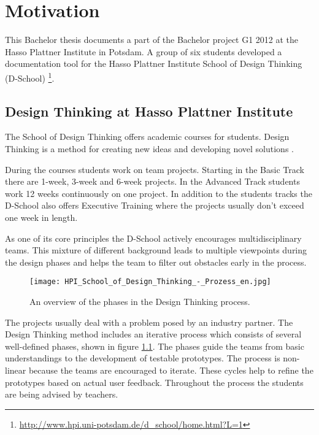 \chapter{Motivation}

This Bachelor thesis documents a part of the Bachelor project G1 2012 at the Hasso Plattner Institute in Potsdam. A group of six students developed a documentation tool for the Hasso Plattner Institute School of Design Thinking (D-School) \footnote{\url{http://www.hpi.uni-potsdam.de/d_school/home.html?L=1}}. 

\section{Design Thinking at Hasso Plattner Institute}
The School of Design Thinking offers academic courses for students. Design Thinking is a method for creating new ideas and developing novel solutions \cite{Plattner_2009}. 

During the courses students work on team projects. Starting in the Basic Track there are 1-week, 3-week and 6-week projects. In the Advanced Track students work 12 weeks continuously on one project. In addition to the students tracks the D-School also offers Executive Training where the projects usually don't exceed one week in length. 

As one of its core principles the D-School actively encourages multidisciplinary teams. This mixture of different background leads to multiple viewpoints during the design phases and helps the team to filter out obstacles early in the process. 

\begin{figure}[h]
\texttt{[image: HPI\_School\_of\_Design\_Thinking\_-\_Prozess\_en.jpg]}
\caption[An overview of the phases in the Design Thinking process. Source: \url{http://www.hpi.uni-potsdam.de/presse/fotos/school_of_design_thinking.html}]{An overview of the phases in the Design Thinking process.}
\label{fig:DT_phases}
\end{figure}

The projects usually deal with a problem posed by an industry partner. The Design Thinking method includes an iterative process which consists of several well-defined phases, shown in figure \ref{fig:DT_phases}. The phases guide the teams from basic understandings to the development of testable prototypes. The process is non-linear because the teams are encouraged to iterate. These cycles help to refine the prototypes based on actual user feedback. Throughout the process the students are being advised by teachers.

